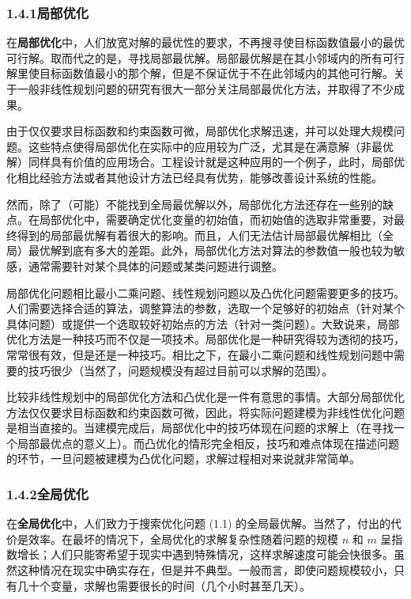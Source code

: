\documentclass[UTF8, 12pt, fontset=fandol, oneside]{ctexart}
\begin{document}
\subsubsection*{1.4.1\quad 局部优化}

在\textbf{局部优化}中，人们放宽对解的最优性的要求，不再搜寻使目标函数值最小的最优可行解。取而代之的是，寻找局部最优解。局部最优解是在其小邻域内的所有可行解里使目标函数值最小的那个解，但是不保证优于不在此邻域内的其他可行解。关于一般非线性规划问题的研究有很大一部分关注局部最优化方法，并取得了不少成果。

由于仅仅要求目标函数和约束函数可微，局部优化求解迅速，并可以处理大规模问题。这些特点使得局部优化在实际中的应用较为广泛，尤其是在满意解（非最优解）同样具有价值的应用场合。工程设计就是这种应用的一个例子，此时，局部优化相比经验方法或者其他设计方法已经具有优势，能够改善设计系统的性能。

然而，除了（可能）不能找到全局最优解以外，局部优化方法还存在一些别的缺点。在局部优化中，需要确定优化变量的初始值，而初始值的选取非常重要，对最终得到的局部最优解有着很大的影响。而且，人们无法估计局部最优解相比（全局）最优解到底有多大的差距。此外，局部优化方法对算法的参数值一般也较为敏感，通常需要针对某个具体的问题或某类问题进行调整。

局部优化问题相比最小二乘问题、线性规划问题以及凸优化问题需要更多的技巧。人们需要选择合适的算法，调整算法的参数，选取一个足够好的初始点（针对某个具体问题）或提供一个选取较好初始点的方法（针对一类问题）。大致说来，局部优化方法是一种技巧而不仅是一项技术。局部优化是一种研究得较为透彻的技巧，常常很有效，但是还是一种技巧。相比之下，在最小二乘问题和线性规划问题中需要的技巧很少（当然了，问题规模没有超过目前可以求解的范围）。

比较非线性规划中的局部优化方法和凸优化是一件有意思的事情。大部分局部优化方法仅仅要求目标函数和约束函数可微，因此，将实际问题建模为非线性优化问题是相当直接的。当建模完成后，局部优化中的技巧体现在问题的求解上（在寻找一个局部最优点的意义上）。而凸优化的情形完全相反，技巧和难点体现在描述问题的环节，一旦问题被建模为凸优化问题，求解过程相对来说就非常简单。

\subsubsection*{1.4.2\quad 全局优化}

在\textbf{全局优化}中，人们致力于搜索优化问题 (1.1) 的全局最优解。当然了，付出的代价是效率。在最坏的情况下，全局优化的求解复杂性随着问题的规模 $n$ 和 $m$ 呈指数增长；人们只能寄希望于现实中遇到特殊情况，这样求解速度可能会快很多。虽然这种情况在现实中确实存在，但是并不典型。一般而言，即使问题规模较小，只有几十个变量，求解也需要很长的时间（几个小时甚至几天）。
\end{document}
